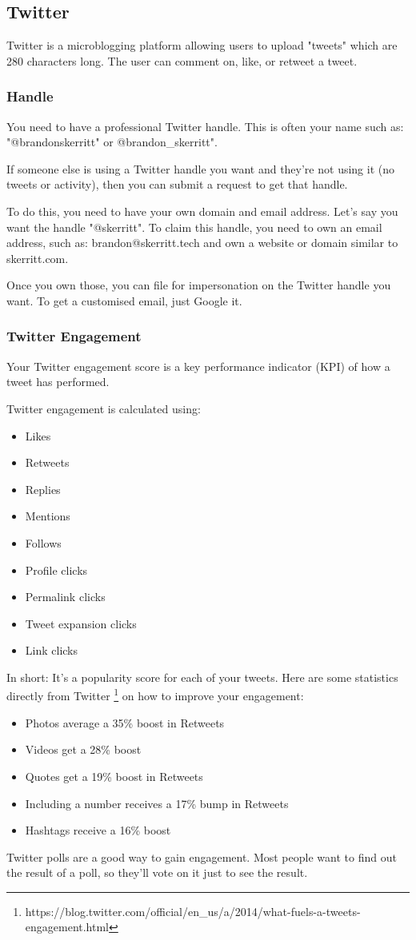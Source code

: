 \documentclass{article}
\begin{document}
\subsection{Twitter}
Twitter is a microblogging platform allowing users to upload "tweets"
which are 280 characters long. The user can comment on, like, or retweet
a tweet.
\subsubsection{Handle}
You need to have a professional Twitter handle. This is often your name
such as: "@brandonskerritt" or @brandon\_skerritt".

If someone else is using a Twitter handle you want and they're not using
it (no tweets or activity), then you can submit a request to get that
handle.

To do this, you need to have your own domain and email address. Let's
say you want the handle "@skerritt". To claim this handle, you need to
own an email address, such as: brandon@skerritt.tech and own a website
or domain similar to skerritt.com.

Once you own those, you can file for impersonation on the Twitter handle
you want. To get a customised email, just Google it.
\subsubsection{Twitter Engagement}
Your Twitter engagement score is a key performance indicator (KPI) of
how a tweet has performed.

Twitter engagement is calculated using:

\begin{itemize}
\item
  Likes
\item
  Retweets
\item
  Replies
\item
  Mentions
\item
  Follows
\item
  Profile clicks
\item
  Permalink clicks
\item
  Tweet expansion clicks
\item
  Link clicks
\end{itemize}
In short: It's a popularity score for each of your tweets.
Here are some statistics directly from Twitter \footnote{https://blog.twitter.com/official/en\_us/a/2014/what-fuels-a-tweets-engagement.html} on how to improve your engagement:
\begin{itemize}
\item
  Photos average a 35\% boost in Retweets
\item
  Videos get a 28\% boost
\item
  Quotes get a 19\% boost in Retweets
\item
  Including a number receives a 17\% bump in Retweets
\item
  Hashtags receive a 16\% boost
\end{itemize}
Twitter polls are a good way to gain engagement. Most people want to
find out the result of a poll, so they'll vote on it just to see the
result.
\end{document}
